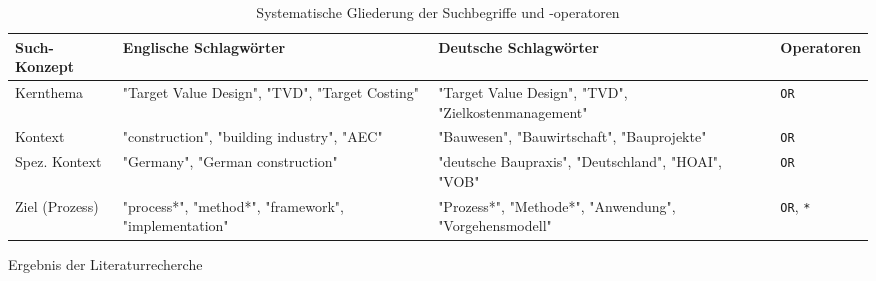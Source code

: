 \begin{table}[hbt!]
  \centering
  \caption{Systematische Gliederung der Suchbegriffe und -operatoren}
  \label{tab:suchstrategie}
  \begin{tabularx}{\textwidth}{l >{\raggedright\arraybackslash}X >{\raggedright\arraybackslash}X l}
    \toprule
    \textbf{Such-Konzept} & \textbf{Englische Schlagwörter} & \textbf{Deutsche Schlagwörter} & \textbf{Operatoren} \\
    \midrule
    Kernthema & "Target Value Design", "TVD", "Target Costing" & "Target Value Design", "TVD", "Zielkostenmanagement" & \texttt{OR} \\
    \addlinespace
    Kontext & "construction", "building industry", "AEC" & "Bauwesen", "Bauwirtschaft", "Bauprojekte" & \texttt{OR} \\
    \addlinespace
    Spez. Kontext & "Germany", "German construction" & "deutsche Baupraxis", "Deutschland", "HOAI", "VOB" & \texttt{OR} \\
    \addlinespace
    Ziel (Prozess) & "process*", "method*", "framework", "implementation" & "Prozess*", "Methode*", "Anwendung", "Vorgehensmodell" & \texttt{OR}, \texttt{*} \\
    \bottomrule
  \end{tabularx}
\end{table}

\clearpage

Ergebnis der Literaturrecherche

